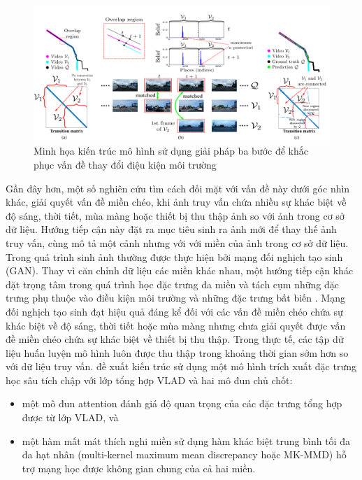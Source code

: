\begin{figure}[h]
    \centering
    \includegraphics[width=\textwidth]{pics/Chapter2/model3step.png}
    \caption{Minh họa kiến trúc mô hình sử dụng giải pháp ba bước để khắc phục vấn đề thay đổi điệu kiện môi trường \cite{doan2019scalable}}
\end{figure}

Gần đây hơn, một số nghiên cứu tìm cách đối mặt với vấn đề này dưới góc nhìn khác, giải quyết vấn đề miền chéo, khi ảnh truy vấn chứa nhiều sự khác biệt về độ sáng, thời tiết, mùa màng hoặc thiết bị thu thập ảnh so với ảnh trong cơ sở dữ liệu. Hướng tiếp cận này đặt ra mục tiêu sinh ra ảnh mới để thay thế ảnh truy vấn, cùng mô tả một cảnh nhưng với với miền của ảnh trong cơ sở dữ liệu. Trong \cite{Porav2018AdversarialTF, Annosheh2019Night} quá trình sinh ảnh thường được thực hiện bởi mạng đối nghịch tạo sinh (GAN). Thay vì căn chỉnh dữ liệu các miền khác nhau, một hướng tiếp cận khác đặt trọng tâm trong quá trình học đặc trưng đa miền và tách cụm những đặc trưng phụ thuộc vào điều kiện môi trường và những đặc trưng bất biến \cite{yin2019multi}. Mạng đối nghịch tạo sinh đạt hiệu quả đáng kể đối với các vấn đề miền chéo chứa sự khác biệt về độ sáng, thời tiết hoặc mùa màng nhưng chưa giải quyết được vấn đề miền chéo chứa sự khác biệt về thiết bị thu thập. Trong thực tế, các tập dữ liệu huấn luyện mô hình luôn được thu thập trong khoảng thời gian sớm hơn so với dữ liệu truy vấn. \cite{wang2019attention} đề xuất kiến trúc sử dụng một mô hình trích xuất đặc trưng học sâu tích chập với lớp tổng hợp VLAD \cite{jegou2010aggregating} và hai mô đun chủ chốt:

\begin{itemize}
    \item một mô đun attention đánh giá độ quan trọng của các đặc trưng tổng hợp được từ lớp VLAD, và
    \item một hàm mất mát thích nghi miền sử dụng hàm khác biệt trung bình tối đa đa hạt nhân (multi-kernel maximum mean discrepancy hoặc MK-MMD) hỗ trợ mạng học được không gian chung của cả hai miền.
\end{itemize}

